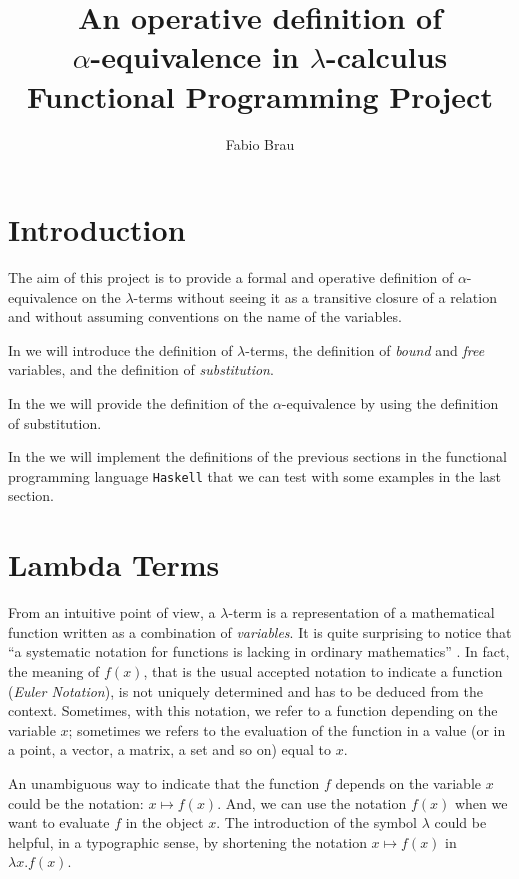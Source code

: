 \documentclass[a4paper,11pt]{article}
\title{An operative definition of \\
  $\alpha$-equivalence in
$\lambda$-calculus\\
{\large Functional Programming Project}}
\author{Fabio Brau}
\theoremstyle{definition}
\begin{document}
\maketitle
\tableofcontents
\section{Introduction}
The aim of this project is to provide a formal and operative 
definition of $\alpha$-equivalence on the $\lambda$-terms without seeing 
it as a transitive closure of a relation and without assuming conventions 
on the name of the variables.

In  we will introduce the definition of
$\lambda$-terms, the definition of \textit{bound} and \textit{free}
variables, and the definition of \textit{substitution}.

In the  we will provide the definition of the
$\alpha$-equivalence by using the definition of substitution.

In the  we will implement the definitions of the
previous sections in the functional programming language \texttt{Haskell}
that we can test with some examples in the last section.

\section{Lambda Terms}
\label{sec:lambda-terms}
From an intuitive point of view, a $\lambda$-term is a representation of
a mathematical function written as a combination of \textit{variables}. It
is quite surprising to notice that ``a systematic notation for functions is lacking
in ordinary mathematics'' \cite{Curry}. In fact, the meaning of $f(x)$, that is the usual
accepted notation to indicate a function (\textit{Euler Notation}), is not uniquely
determined and has to be deduced from the context. Sometimes, with this
notation, we refer to a function depending on the variable $x$; sometimes we refers to the
evaluation of the function in a value (or in a point, a vector, a matrix, a
set and so on) equal to $x$.

An unambiguous way to indicate that the function $f$ depends on the variable $x$ 
could be the notation: $x\mapsto f(x)$. And, we can use the notation $f(x)$
when we want to evaluate $f$ in the object $x$. The introduction of the
symbol $\lambda$ could be helpful, in a typographic sense, by shortening the
notation $x\mapsto f(x)$ in $\lambda x.f(x)$.
\end{document}
